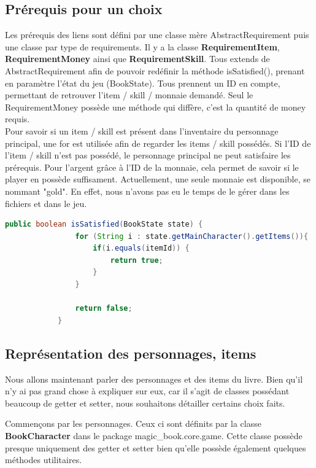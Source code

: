 		\subsection{Prérequis pour un choix}
			Les prérequis des liens sont défini par une classe mère AbstractRequirement puis une classe par type de requirements. Il y a la classe \textbf{RequirementItem}, \textbf{RequirementMoney} ainsi que \textbf{RequirementSkill}. Tous extends de AbstractRequirement afin de pouvoir redéfinir la méthode isSatisfied(), prenant en paramètre l'état du jeu (BookState). Tous prennent un ID en compte, permettant de retrouver l'item / skill / monnaie demandé. Seul le RequirementMoney possède une méthode qui diffère, c'est la quantité de money requis.\\
			Pour savoir si un item / skill est présent dans l'inventaire du personnage principal, une for est utilisée afin de regarder les items / skill possédés. Si l'ID de l'item / skill n'est pas possédé, le personnage principal ne peut satisfaire les prérequis. Pour l'argent grâce à l'ID de la monnaie, cela permet de savoir si le player en possède suffisament. Actuellement, une seule monnaie est disponible, se nommant "gold". En effet, nous n'avons pas eu le temps de le gérer dans les fichiers et dans le jeu.

			\begin{lstlisting}[gobble=12, language=java, caption=exemple de isSatisfied(), label=isSatisfied]
			public boolean isSatisfied(BookState state) {
				for (String i : state.getMainCharacter().getItems()){
					if(i.equals(itemId)) {
						return true;
					}
				}

				return false;
			}
			\end{lstlisting}


		\subsection{Représentation des personnages, items}

			Nous allons maintenant parler des personnages et des items du livre. Bien qu'il n'y ai pas grand chose à expliquer sur eux, car il s'agit de classes possédant beaucoup de getter et setter, nous souhaitons détailler certains choix faits.

			Commençons par les personnages. Ceux ci sont définits par la classe \textbf{BookCharacter} dans le package magic\_book.core.game. Cette classe possède presque uniquement des getter et setter bien qu'elle possède également quelques méthodes utilitaires.

